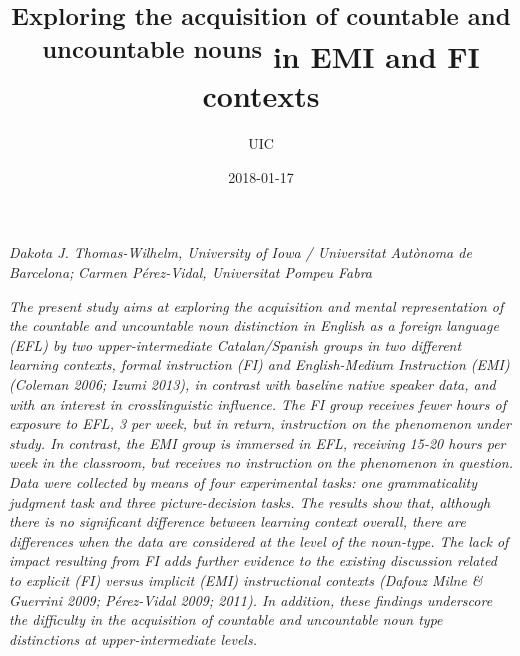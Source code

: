 \documentclass[12pt]{article}
\title{}
\author{UIC}
\date{2018-01-17}
\newenvironment{styleStandard}{\setlength\leftskip{0cm}\setlength\rightskip{0cm plus 1fil}\setlength\parindent{0cm}\setlength\parfillskip{0pt plus 1fil}\setlength\parskip{0in plus 1pt}\writerlistparindent\writerlistleftskip\leavevmode\normalfont\normalsize\writerlistlabel\ignorespaces}{\unskip\vspace{0.111in plus 0.0111in}\par}
\newenvironment{stylelsAbstract}{\setlength\leftskip{0.5in}\setlength\rightskip{0.5in}\setlength\parindent{0in}\setlength\parfillskip{0pt plus 1fil}\setlength\parskip{0in plus 1pt}\writerlistparindent\writerlistleftskip\leavevmode\normalfont\normalsize\itshape\writerlistlabel\ignorespaces}{\unskip\vspace{0.111in plus 0.0111in}\par}
\newcommand\writerlistleftskip{}
\newcommand\writerlistparindent{}
\newcommand\writerlistlabel{}
\begin{document}
\title{\textsuperscript{Exploring the acquisition of countable and uncountable nouns }\newline
in EMI and FI contexts}
\maketitle

\begin{styleStandard}
\textit{Dakota J. Thomas-Wilhelm, University of Iowa / Universitat Autònoma de Barcelona; }\textit{Carmen Pérez-Vidal, Universitat Pompeu Fabra}
\end{styleStandard}

\begin{stylelsAbstract}
The present study aims at exploring the acquisition and mental representation of the countable and uncountable noun distinction in English as a foreign language (EFL) by two upper-intermediate Catalan/Spanish groups in two different learning contexts, formal instruction (FI) and English-Medium Instruction (EMI) (Coleman 2006; Izumi 2013), in contrast with baseline native speaker data, and with an interest in crosslinguistic influence. The FI group receives fewer hours of exposure to EFL, 3 per week, but in return, instruction on the phenomenon under study. In contrast, the EMI group is immersed in EFL, receiving 15-20 hours per week in the classroom, but receives no instruction on the phenomenon in question. Data were collected by means of four experimental tasks: one grammaticality judgment task and three picture-decision tasks. The results show that, although there is no significant difference between learning context overall, there are differences when the data are considered at the level of the noun-type. The lack of impact resulting from FI adds further evidence to the existing discussion related to explicit (FI) versus implicit (EMI) instructional contexts (Dafouz Milne \& Guerrini 2009; Pérez-Vidal 2009; 2011). In addition, these findings underscore the difficulty in the acquisition of countable and uncountable noun type distinctions at upper-intermediate levels. 
\end{stylelsAbstract}
\end{document}
